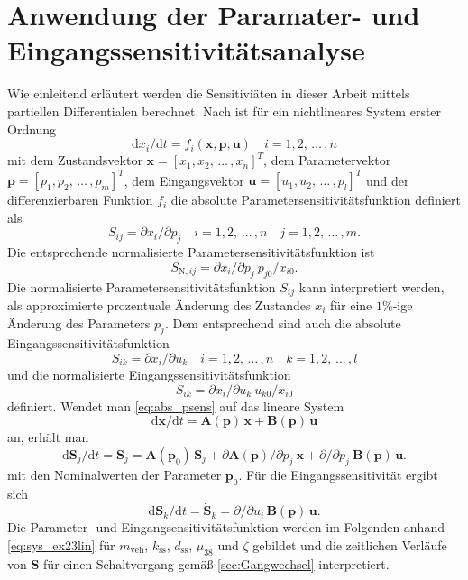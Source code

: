 \section{Anwendung der Paramater- und Eingangssensitivitätsanalyse}\label{sec:para_sens}
Wie einleitend erläutert werden die Sensitiviäten in dieser Arbeit mittels partiellen Differentialen berechnet. Nach \cite{Hearne.1985} ist für ein nichtlineares System erster Ordnung
\begin{equation}
\mathrm{d} x_i/\mathrm{d} t = f_i(\pmb{x},\pmb{p},\pmb{u})\quad i=1,2,\,\dots\, ,n 
\end{equation}
mit dem Zustandsvektor $\pmb{x} = [x_1, x_2,\, \dots\, ,x_n]^T$, dem Parametervektor $\pmb{p} = [p_1, p_2,\, \dots\, ,p_m]^T$, dem Eingangsvektor $\pmb{u} = [u_1, u_2,\, \dots\, ,p_l]^T$ und der differenzierbaren Funktion $f_i$ die absolute Parametersensitivitätsfunktion definiert als
\begin{equation}\label{eq:abs_psens}
S_{ij} = \partial x_i/\partial p_j \quad i=1,2,\,\dots\, ,n \quad j=1,2,\,\dots\, ,m.
\end{equation}
Die entsprechende normalisierte Parametersensitivitätsfunktion ist 
\begin{equation}
S_{\mathrm{N},ij} = \partial x_i/\partial p_j\ p_{j0}/x_{i0}.
\end{equation}
Die normalisierte Parametersensitivitätsfunktion $S_{ij}$ kann interpretiert werden, als approximierte prozentuale Änderung des Zustandes $x_i$ für eine $1\%$-ige Änderung des Parameters $p_j$. Dem entsprechend sind auch die absolute Eingangssensitivitätsfunktion
\begin{equation}\label{eq:abs_usens}
S_{ik} = \partial x_i/\partial u_k \quad i=1,2,\,\dots\, ,n \quad k=1,2,\,\dots\, ,l
\end{equation}
und die normalisierte Eingangssensitivitätsfunktion
\begin{equation}\label{eq:abs_usens}
S_{ik} = \partial x_i/\partial u_k\ u_{k0}/x_{i0}
\end{equation}
definiert.
Wendet man \eqref{eq:abs_psens} auf das lineare System 
\begin{equation}
\mathrm{d} \pmb{x}/\mathrm{d} t = \pmb{A}(\pmb{p})\,\pmb{x}+\pmb{B}(\pmb{p})\,\pmb{u}
\end{equation}
an, erhält man
\begin{equation}\label{eq:Sens_lineq}
\mathrm{d} \pmb{S}_j/\mathrm{d} t = \dot{\pmb{S}}_j= \pmb{A}(\pmb{p}_0)\,\pmb{S}_j+\partial\pmb{A}(\pmb{p})/\partial p_j\ \pmb{x}+\partial/\partial p_j\ \pmb{B}(\pmb{p})\,\pmb{u}.
\end{equation}
mit den Nominalwerten der Parameter $\pmb{p}_0$.
Für die Eingangssensitivität ergibt sich 
\begin{equation}
\mathrm{d} \pmb{S}_k/\mathrm{d} t = \dot{\pmb{S}}_k= \partial/\partial u_i\, \pmb{B}(\pmb{p})\,\pmb{u}.
\end{equation}
Die Parameter- und Eingangsensitivitätsfunktion werden im Folgenden anhand \eqref{eq:sys_ex23lin} für $m_\mathrm{veh}$, $k_\mathrm{ss}$, $d_\mathrm{ss}$, $\mu_{38}$ und $\zeta$ gebildet und die zeitlichen Verläufe von $\pmb{S}$ für einen Schaltvorgang gemäß \ref{sec:Gangwechsel} interpretiert.


